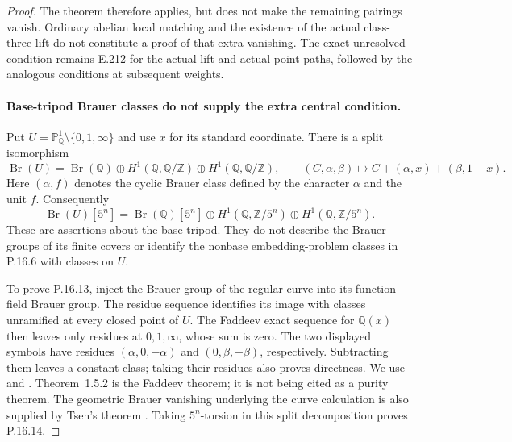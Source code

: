 \begin{proof}
The theorem therefore applies, but does not make the remaining
pairings vanish. Ordinary abelian local matching and the
existence of the actual class-three lift do not constitute
a proof of that extra vanishing. The exact unresolved
condition remains E.212 for the actual lift and actual
point paths, followed by the analogous conditions at
subsequent weights.


\paragraph{Base-tripod Brauer classes do not supply the extra central condition.}
Put $U=\mathbb P^1_{\mathbb Q}\setminus\{0,1,\infty\}$ and use
$x$ for its standard coordinate. There is a split isomorphism
\[
 \operatorname{Br}(U)
 =\operatorname{Br}(\mathbb Q)
   \oplus H^1(\mathbb Q,\mathbb Q/\mathbb Z)
   \oplus H^1(\mathbb Q,\mathbb Q/\mathbb Z),
 \qquad (C,\alpha,\beta)\longmapsto
 C+(\alpha,x)+(\beta,1-x).
 \tag{P.16.13}
\]
Here $(\alpha,f)$ denotes the cyclic Brauer class defined by the
character $\alpha$ and the unit $f$. Consequently
\[
 \operatorname{Br}(U)[5^n]
 =\operatorname{Br}(\mathbb Q)[5^n]
   \oplus H^1(\mathbb Q,\mathbb Z/5^n)
   \oplus H^1(\mathbb Q,\mathbb Z/5^n).
 \tag{P.16.14}
\]
These are assertions about the base tripod. They do not describe
the Brauer groups of its finite covers or identify the nonbase
embedding-problem classes in P.16.6 with classes on $U$.

To prove P.16.13, inject the Brauer group of the regular curve into
its function-field Brauer group. The residue sequence identifies
its image with classes unramified at every closed point of $U$.
The Faddeev exact sequence for $\mathbb Q(x)$ then leaves only
residues at $0,1,\infty$, whose sum is zero. The two displayed
symbols have residues $(\alpha,0,-\alpha)$ and
$(0,\beta,-\beta)$, respectively. Subtracting them leaves a
constant class; taking their residues also proves directness.
We use \citet[Theorem~6.9.1, p.~176]{RecoveryGilleSzamuely2006}
and \citet[Theorem~1.5.2, p.~44; Theorem~3.5.4, pp.~88--89;
Proposition~3.6.1, pp.~89--91]{RecoveryColliotTheleneSkorobogatov2019}.
Theorem~1.5.2 is the Faddeev theorem; it is not being cited as a
purity theorem. The geometric Brauer vanishing underlying the
curve calculation is also supplied by Tsen's theorem
\citep[Theorem~6.2.8, p.~143]{RecoveryGilleSzamuely2006}.
Taking $5^n$-torsion in this split decomposition proves P.16.14.


\end{proof}
